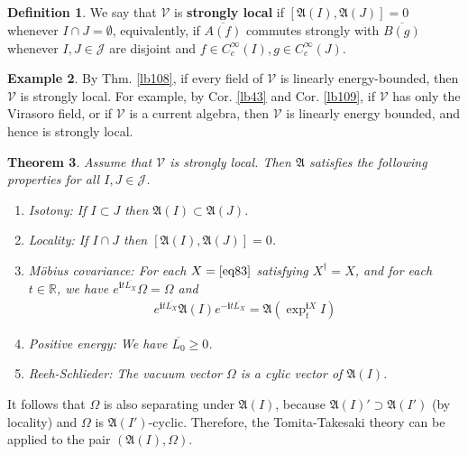 \documentclass[12pt,b5paper,notitlepage]{article}
\theoremstyle{definition}
\newtheorem{df}{Definition}[section]
\newtheorem{eg}[df]{Example}
\theoremstyle{plain}
\newtheorem{thm}[df]{Theorem}
\newcommand{\fk}{\mathfrak}
\newcommand{\mc}{\mathcal}
\newcommand{\ovl}{\overline}
\newcommand{\im}{\mathbf{i}}
\newcommand{\Rbb}{\mathbb R}
\newcommand{\MV}{\mathcal V}
\numberwithin{equation}{section}
\begin{document}
\subsection{}




\begin{df}
We say that $\mc V$ is \textbf{strongly local}  if $[\fk A(I),\fk A(J)]=0$ whenever $I\cap J=\emptyset$, equivalently, if $\ovl{A(f)}$ commutes strongly with $\ovl {B(g)}$ whenever $I,J\in\mc J$ are disjoint and $f\in C_c^\infty(I),g\in C_c^\infty(J)$.
\end{df}


\begin{eg}
By Thm. \ref{lb108}, if every field of $\mc V$ is linearly energy-bounded, then $\MV$ is strongly local. For example, by Cor. \ref{lb43} and Cor. \ref{lb109}, if $\MV$ has only the Virasoro field, or if $\MV$ is a current algebra, then $\MV$ is linearly energy bounded, and hence is strongly local.
\end{eg}



\begin{thm}\label{lb99}
Assume that $\MV$ is strongly local. Then $\fk A$ satisfies the following properties for all $I,J\in\mc J$.
\begin{enumerate}[label=(\alph*)]
\item Isotony: If $I\subset J$ then $\fk A(I)\subset\fk A(J)$.
\item Locality: If $I\cap J$ then $[\fk A(I),\fk A(J)]=0$.
\item M\"obius covariance: For each $X=\eqref{eq83}$ satisfying $X^\dagger=X$, and for each $t\in\Rbb$, we have $e^{\im t\ovl{L_X}}\Omega=\Omega$ and
\begin{align*}
e^{\im t\ovl{L_X}}\fk A(I)e^{-\im t\ovl{L_X}}=\fk A(\exp^{\im X}_t I)
\end{align*}
\item Positive energy: We have $\ovl{L_0}\geq0$.
\item Reeh-Schlieder: The vacuum vector $\Omega$ is a cylic vector of $\fk A(I)$.
\end{enumerate}
\end{thm}

It follows that $\Omega$ is also separating under $\fk A(I)$, because $\fk A(I)'\supset \fk A(I')$ (by locality) and $\Omega$ is $\fk A(I')$-cyclic. Therefore, the Tomita-Takesaki theory can be applied to the pair $(\fk A(I),\Omega)$.
\end{document}
